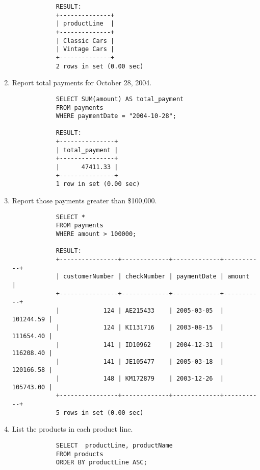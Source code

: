 \documentclass{article}
\begin{document}
\begin{enumerate}
\begin{verbatim}
			RESULT:
			+--------------+
			| productLine  |
			+--------------+
			| Classic Cars |
			| Vintage Cars |
			+--------------+
			2 rows in set (0.00 sec)
			\end{verbatim}
		\item Report total payments for October 28, 2004.
			\begin{verbatim}
			SELECT SUM(amount) AS total_payment
			FROM payments
			WHERE paymentDate = "2004-10-28";
			
			RESULT:
			+---------------+
			| total_payment |
			+---------------+
			|      47411.33 |
			+---------------+
			1 row in set (0.00 sec)
			\end{verbatim}
		\item Report those payments greater than \$100,000.
			\begin{verbatim}
			SELECT *
			FROM payments
			WHERE amount > 100000;
			
			RESULT:
			+----------------+-------------+-------------+-----------+
			| customerNumber | checkNumber | paymentDate | amount    |
			+----------------+-------------+-------------+-----------+
			|            124 | AE215433    | 2005-03-05  | 101244.59 |
			|            124 | KI131716    | 2003-08-15  | 111654.40 |
			|            141 | ID10962     | 2004-12-31  | 116208.40 |
			|            141 | JE105477    | 2005-03-18  | 120166.58 |
			|            148 | KM172879    | 2003-12-26  | 105743.00 |
			+----------------+-------------+-------------+-----------+
			5 rows in set (0.00 sec)
			\end{verbatim}
		\item List the products in each product line.
			\begin{verbatim}
			SELECT  productLine, productName
			FROM products
			ORDER BY productLine ASC;
			

\end{verbatim}
\end{enumerate}
\end{document}
